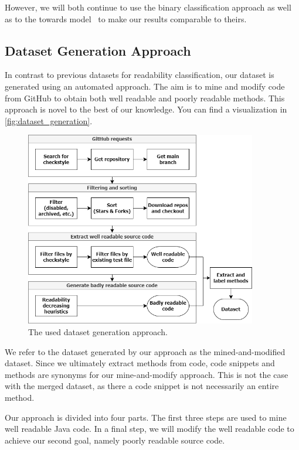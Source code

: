 \documentclass[%
class=scrreprt,
chapterprefix=false,%
open=right,%
twoside=false,%
paper=a4,%
logofile={Logo\_zentral\_farbig\_EN.png},%
thesistype=master,%
UKenglish,%
]{se2thesis}
\theoremstyle{definition}
\begin{document}
	However, we will both continue to use the binary classification approach as well as to the towards model~\cite{mi2022towards} to make our results comparable to theirs.
	
\subsection{Dataset Generation Approach} \label{Dataset Generation Approach}
	In contrast to previous datasets for readability classification, our dataset is generated using an automated approach. The aim is to mine and modify code from GitHub to obtain both well readable and poorly readable methods. This approach is novel to the best of our knowledge. You can find a visualization in \autoref{fig:dataset_generation}.
	
	\begin{figure}[tb]
		\centering
		\includegraphics[width=0.9\textwidth]{img/dataset_generation.png}
		\caption{The used dataset generation approach.}
		\label{fig:dataset_generation}
	\end{figure}
	
	We refer to the dataset generated by our approach as the mined-and-modified dataset.
	Since we ultimately extract methods from code, code snippets and methods are synonyms for our mine-and-modify approach. This is not the case with the merged dataset, as there a code snippet is not necessarily an entire method.
	
	Our approach is divided into four parts. The first three steps are used to mine well readable Java code. In a final step, we will modify the well readable code to achieve our second goal, namely poorly readable source code.
	
\end{document}
